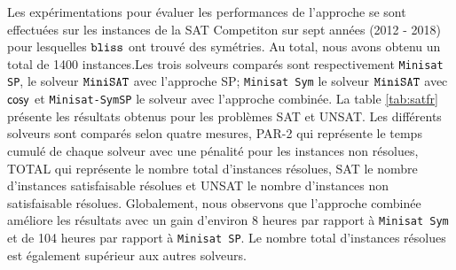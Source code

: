 Les expérimentations pour évaluer les performances de l'approche se sont effectuées sur les instances de la SAT Competiton sur sept années (2012 - 2018) pour lesquelles $\texttt{bliss}$ ont trouvé des symétries. Au total, nous avons obtenu un total de 1400 instances.Les trois solveurs comparés sont respectivement \texttt{Minisat SP}, le solveur $\texttt{MiniSAT}$ avec l'approche SP; \texttt{Minisat Sym} le solveur $\texttt{MiniSAT}$ avec $\textsf{cosy}$ et \texttt{Minisat-SymSP} le solveur avec l'approche combinée.
La table \ref{tab:satfr} présente les résultats obtenus pour les problèmes SAT et UNSAT.
Les différents solveurs sont comparés selon quatre mesures, PAR-2 qui représente le temps cumulé de chaque solveur 
avec une pénalité pour les instances non résolues, \-TOTAL qui représente le nombre total d'instances résolues, SAT le nombre d'instances satisfaisable résolues et UNSAT le nombre d'instances  non satisfaisable résolues.
Globalement, nous observons que l'approche combinée améliore les résultats avec un gain d'environ 8 heures par rapport
à \texttt{Minisat Sym} et de 104 heures par rapport à \texttt{Minisat SP}. Le nombre total d'instances résolues est également
supérieur aux autres solveurs.


